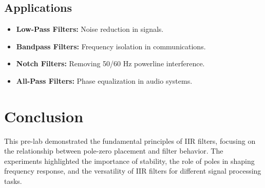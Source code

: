 \documentclass[12pt]{article}
\begin{document}
	\subsection*{Applications}
	\begin{itemize}
		\item \textbf{Low-Pass Filters:} Noise reduction in signals.
		\item \textbf{Bandpass Filters:} Frequency isolation in communications.
		\item \textbf{Notch Filters:} Removing 50/60 Hz powerline interference.
		\item \textbf{All-Pass Filters:} Phase equalization in audio systems.
	\end{itemize}
	
	\section*{Conclusion}
	This pre-lab demonstrated the fundamental principles of IIR filters, focusing on the relationship between pole-zero placement and filter behavior. The experiments highlighted the importance of stability, the role of poles in shaping frequency response, and the versatility of IIR filters for different signal processing tasks.
	
\end{document}
